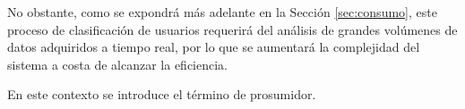 \vspace{3mm}

No obstante, como se expondrá más adelante en la Sección \ref{sec:consumo}, este proceso de clasificación de usuarios requerirá del análisis de grandes volúmenes de datos adquiridos a tiempo real, por lo que se aumentará la complejidad del sistema a costa de alcanzar la eficiencia.



\vspace{3mm}


\cite{impact}


En este contexto se introduce el término de prosumidor.






















\cite{repsol} 



